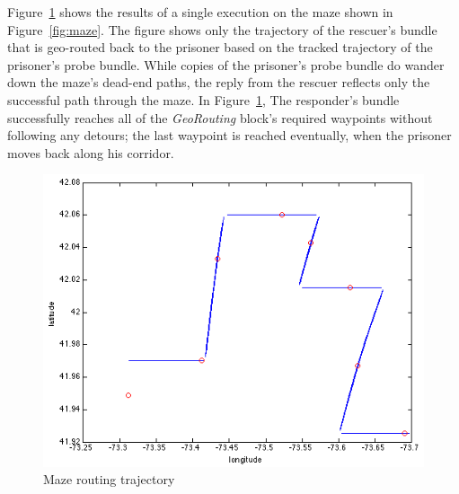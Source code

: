 Figure~\ref{fig:mazeExperiment} shows the results of a single
execution on the maze shown in Figure~\ref{fig:maze}. The figure shows
only the trajectory of the rescuer's bundle that is geo-routed back to
the prisoner based on the tracked trajectory of the prisoner's probe
bundle. While copies of the prisoner's probe bundle do wander down the
maze's dead-end paths, the reply from the rescuer reflects only the
successful path through the maze. In Figure~\ref{fig:mazeExperiment},
The responder's bundle successfully reaches all of the {\em
  GeoRouting} block's required waypoints without following any
detours; the last waypoint is reached eventually, when the prisoner
moves back along his corridor.
\begin{figure}
\begin{center}
\includegraphics[width=\columnwidth]{figures/mazeExperiment.png}
\end{center}
\vspace{-.75cm}
\caption{Maze routing trajectory}
\label{fig:mazeExperiment}
\vspace{-.5cm}
\end{figure}
